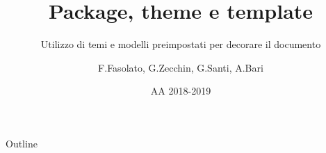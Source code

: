 \documentclass[dvipsnames]{beamer}
\title{Package, theme e template}
\subtitle{Utilizzo di temi e modelli preimpostati per decorare il documento}
\author{F.Fasolato, G.Zecchin, G.Santi, A.Bari}
\date{AA 2018-2019}
\begin{document}
	\maketitle
	\begin{frame}{Outline}
        \tableofcontents
    \end{frame}
	
	
	
	
	
	
	
	
	
\end{document}
